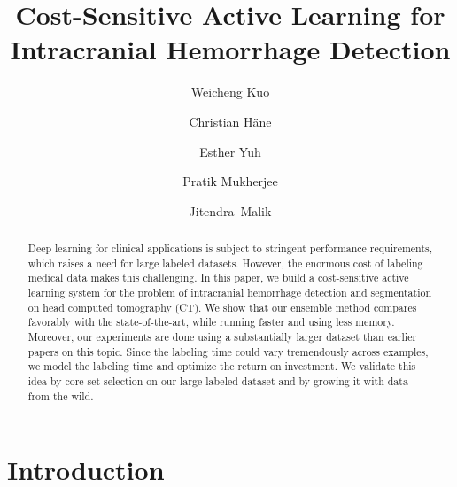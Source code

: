 \documentclass{llncs}
\begin{document}
\frontmatter          %
\pagestyle{headings}  %
\mainmatter              %
\title{Cost-Sensitive Active Learning for Intracranial Hemorrhage Detection}

\author{Weicheng Kuo \and
Christian H{\"a}ne\and
Esther Yuh  \and
Pratik Mukherjee \and
Jitendra~Malik}

\maketitle              %

\begin{abstract}

Deep learning for clinical applications is subject to stringent performance requirements, which raises a need for large labeled datasets. However, the enormous cost of labeling medical data makes this challenging. In this paper, we build a cost-sensitive active learning system for the problem of intracranial hemorrhage detection and segmentation on head computed tomography (CT).  We show that our ensemble method compares favorably with the state-of-the-art, while running faster and using less memory. Moreover, our experiments are done using a substantially larger dataset than earlier papers on this topic. Since the labeling time could vary tremendously across examples, we model the labeling time and optimize the return on investment. We validate this idea by core-set selection on our large labeled dataset and by growing it with data from the wild. 

\end{abstract}

\vspace*{-0.5cm}
\section{Introduction}
\vspace*{-0.2cm}
\end{document}
